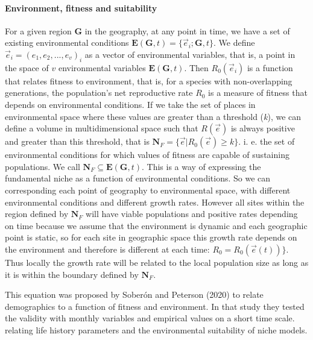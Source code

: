 \documentclass[
]{article}
\begin{document}
\hypertarget{environment-fitness-and-suitability}{%
\paragraph{Environment, fitness and
suitability}\label{environment-fitness-and-suitability}}

For a given region \(\mathbf{G}\) in the geography, at any point in time,
we have a set of existing environmental conditions
\(\mathbf{E}(\mathbf{G}, t) = \Big \{ \vec{e}_i; \mathbf{G}, t\Big \}\).
We define \(\vec{e}_i =(e_1, e_2, ..., e_v )_i\) as a vector of
environmental variables, that is, a point in the space of \(v\)
environmental variables \(\mathbf{E}(\mathbf{G}, t)\). Then
\(R_0(\vec{e}_i)\) is a function that relates fitness to environment,
that is, for a species with non-overlapping generations, the
population's net reproductive rate \(R_0\) is a measure of fitness that
depends on environmental conditions. If we take the set of places in
environmental space where these values are greater than a threshold (\textit{k}), we
can define a volume in multidimensional space such that \(R(\vec{e})\)
is always positive and greater than this threshold, that is
\(\mathbf{N}_F=\{\vec{e} | R_0(\vec{e}) \ge k \}\). i. e. the set of
environmental conditions for which values of fitness are capable of
sustaining populations. We call
\(\mathbf{N}_F \subseteq \mathbf{E}(\mathbf{G}, t)\). This is a way of
expressing the fundamental niche as a function of environmental
conditions. So we can corresponding each point of geography to
environmental space, with different environmental conditions and
different growth rates. However all sites within the region defined by
\(\mathbf{N}_F\) will have viable populations and positive rates
depending on time because we assume that the environment is dynamic and
each geographic point is static, so for each site in geographic space
this growth rate depends on the environment and therefore is different
at each time: \(R_0 = R_0(\vec{e}(t)) \}\). Thus locally the growth rate
will be related to the local population size as long as it is within the
boundary defined by \(\mathbf{N}_F\).

This equation was proposed by Soberón and Peterson
(2020) to relate demographics to a function of fitness and environment.
In that study they tested the validity with monthly variables and
empirical values on a short time scale. relating life history parameters
and the environmental suitability of niche models.
\end{document}
